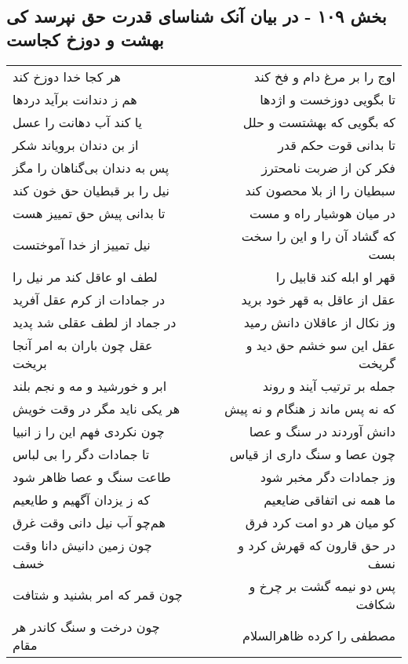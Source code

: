 \begin{center}
\section*{بخش ۱۰۹ - در بیان آنک شناسای قدرت حق نپرسد کی بهشت و دوزخ کجاست}
\label{sec:sh109}
\begin{longtable}{l p{0.5cm} r}
هر کجا خدا دوزخ کند
&&
اوج را بر مرغ دام و فخ کند
\\
هم ز دندانت برآید دردها
&&
تا بگویی دوزخست و اژدها
\\
یا کند آب دهانت را عسل
&&
که بگویی که بهشتست و حلل
\\
از بن دندان برویاند شکر
&&
تا بدانی قوت حکم قدر
\\
پس به دندان بی‌گناهان را مگز
&&
فکر کن از ضربت نامحترز
\\
نیل را بر قبطیان حق خون کند
&&
سبطیان را از بلا محصون کند
\\
تا بدانی پیش حق تمییز هست
&&
در میان هوشیار راه و مست
\\
نیل تمییز از خدا آموختست
&&
که گشاد آن را و این را سخت بست
\\
لطف او عاقل کند مر نیل را
&&
قهر او ابله کند قابیل را
\\
در جمادات از کرم عقل آفرید
&&
عقل از عاقل به قهر خود برید
\\
در جماد از لطف عقلی شد پدید
&&
وز نکال از عاقلان دانش رمید
\\
عقل چون باران به امر آنجا بریخت
&&
عقل این سو خشم حق دید و گریخت
\\
ابر و خورشید و مه و نجم بلند
&&
جمله بر ترتیب آیند و روند
\\
هر یکی ناید مگر در وقت خویش
&&
که نه پس ماند ز هنگام و نه پیش
\\
چون نکردی فهم این را ز انبیا
&&
دانش آوردند در سنگ و عصا
\\
تا جمادات دگر را بی لباس
&&
چون عصا و سنگ داری از قیاس
\\
طاعت سنگ و عصا ظاهر شود
&&
وز جمادات دگر مخبر شود
\\
که ز یزدان آگهیم و طایعیم
&&
ما همه نی اتفاقی ضایعیم
\\
هم‌چو آب نیل دانی وقت غرق
&&
کو میان هر دو امت کرد فرق
\\
چون زمین دانیش دانا وقت خسف
&&
در حق قارون که قهرش کرد و نسف
\\
چون قمر که امر بشنید و شتافت
&&
پس دو نیمه گشت بر چرخ و شکافت
\\
چون درخت و سنگ کاندر هر مقام
&&
مصطفی را کرده ظاهرالسلام
\\
\end{longtable}
\end{center}
